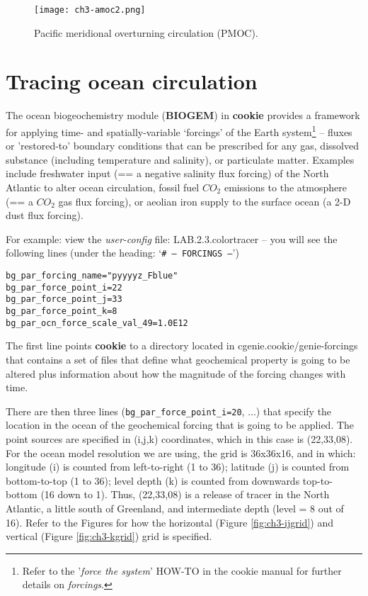 \begin{figure}
\texttt{[image: ch3-amoc2.png]}\centering
\vspace{-0mm}
\caption{Pacific meridional overturning circulation (PMOC).}
\label{fig:ch3-amoc2}
\end{figure}

\newpage

\section{Tracing ocean circulation}

The ocean biogeochemistry module (\textbf{BIOGEM}) in \textbf{cookie} provides a framework for applying time- and spatially-variable ‘forcings’ of the Earth system\footnote{Refer to the '\textit{force the system}' \textsf{HOW-TO} in the cookie manual for further details on \textit{forcings}.} – fluxes or 'restored-to' boundary conditions that can be prescribed for any gas, dissolved substance (including temperature and salinity), or particulate matter. Examples include freshwater input (== a negative salinity flux forcing) of the North Atlantic to alter ocean circulation, fossil fuel \(CO_{2}\) emissions to the atmosphere (== a \(CO_{2}\) gas flux forcing), or aeolian iron supply to the surface ocean (a 2-D dust flux forcing).

\vspace{1mm}
For example: view the \textit{user-config} file: \textsf{\footnotesize LAB.2.3.colortracer} – you will see the following lines (under the heading: ‘\texttt{\# --- FORCINGS ---}’)

\vspace{-2mm}\small
\begin{verbatim}
bg_par_forcing_name="pyyyyz_Fblue"
bg_par_force_point_i=22
bg_par_force_point_j=33
bg_par_force_point_k=8
bg_par_ocn_force_scale_val_49=1.0E12
\end{verbatim}
\normalsize\vspace{-2mm}

The first line points \textbf{cookie} to a directory located in \textsf{\footnotesize cgenie.cookie/genie-forcings} that contains a set of files that define what geochemical property is going to be altered plus information about how the magnitude of the forcing changes with time.

There are then three lines (\texttt{bg\_par\_force\_point\_i=20}, ...) that specify the location in the ocean of the geochemical forcing that is going to be applied. The point sources are specified in (i,j,k) coordinates, which in this case is (22,33,08). For the ocean model resolution we are using, the grid is 36x36x16, and in which: longitude (i) is counted from left-to-right (1 to 36); latitude (j) is counted from bottom-to-top (1 to 36); level depth (k) is counted from downwards top-to-bottom (16 down to 1). Thus, (22,33,08) is a release of tracer in the North Atlantic, a little south of Greenland, and intermediate depth (level = 8 out of 16). Refer to the Figures for how the horizontal (Figure \ref{fig:ch3-ijgrid}) and vertical (Figure \ref{fig:ch3-kgrid}) grid is specified.

